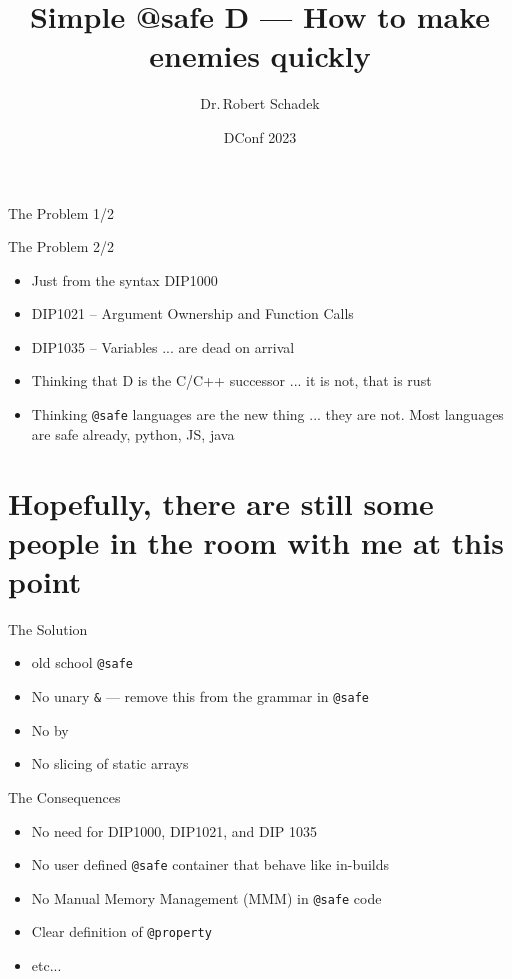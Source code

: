 \documentclass[aspectratio=169,notes]{beamer}
\title{Simple @safe D --- How to make enemies quickly}
\date{DConf 2023}
\author{Dr.\,Robert Schadek}
\begin{document}
	\maketitle

	\begin{frame}[fragile]{The Problem 1/2}
		
	\end{frame}

	\begin{frame}[fragile]{The Problem 2/2}
		\begin{itemize}
			\item Just from the syntax DIP1000 	
			\item DIP1021 -- Argument Ownership and Function Calls	
			\item DIP1035 -- \lstinline@@system@ Variables ... are dead on arrival	
		\end{itemize}
		\begin{itemize}	
			\item Thinking that D is the C/C++ successor ... it is not, that is rust
			\item Thinking \lstinline|@safe| languages are the new thing ...
they are not. Most languages are safe already, python, JS, java
		\end{itemize}
	\end{frame}

	\section{Hopefully, there are still some people in the room with me at this point}

	\begin{frame}[fragile]{The Solution}
		\begin{itemize}
			\item old school \lstinline|@safe|
			\item No unary \lstinline|&| --- remove this from the grammar in \lstinline|@safe|
			\item No \lstinline@return@ by \lstinline@ref@
			\item No slicing of static arrays
		\end{itemize}
	\end{frame}

	\begin{frame}[fragile]{The Consequences}
		\begin{itemize}
			\item No need for DIP1000, DIP1021, and DIP 1035
			\item No user defined \lstinline|@safe| container that behave like in-builds
			\item No Manual Memory Management (MMM) in \lstinline|@safe| code
			\item Clear definition of \lstinline|@property|
			\item etc...
		\end{itemize}
	\end{frame}
\end{document}
